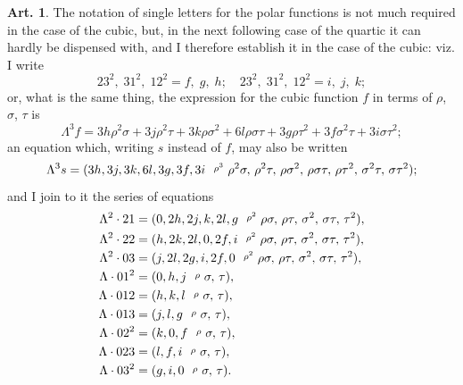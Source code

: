 \documentclass[12pt,a4paper]{article}
\theoremstyle{definition}
\newtheorem{art}{Art.}[section]
\begin{document}
\begin{art}\label{art:50}
The notation of single letters for the polar functions is not much required in the case of the cubic, but, in the next following case of the quartic it can hardly be dispensed with, and I therefore establish it in the case of the cubic: viz. I write
\[
23^2,\; 31^2,\; 12^2 = f,\; g,\; h;\quad 23^2,\; 31^2,\; 12^2 = i,\; j,\; k;
\]
or, what is the same thing, the expression for the cubic function $f$ in terms of $\rho$, $\sigma$, $\tau$ is
\[
\Lambda^3 f = 3h\rho^2\sigma + 3j\rho^2\tau + 3k\rho\sigma^2 + 6l\rho\sigma\tau + 3g\rho\tau^2 + 3f\sigma^2\tau + 3i\sigma\tau^2;
\]
an equation which, writing $s$ instead of $f$, may also be written
\[
\Lambda^3 s = (3h, 3j, 3k, 6l, 3g, 3f, 3i \,\,\,\, \raisebox{0.5ex}{\text{\scriptsize$\rho^3$}}\,\, \rho^2\sigma,\, \rho^2\tau,\, \rho\sigma^2,\, \rho\sigma\tau,\, \rho\tau^2,\, \sigma^2\tau,\, \sigma\tau^2);
\]
and I join to it the series of equations
\begin{align*}
\Lambda^2 \cdot 21 &= (0, 2h, 2j, k, 2l, g \,\,\,\, \raisebox{0.5ex}{\text{\scriptsize$\rho^2$}}\,\, \rho\sigma,\, \rho\tau,\, \sigma^2,\, \sigma\tau,\, \tau^2),\\
\Lambda^2 \cdot 22 &= (h, 2k, 2l, 0, 2f, i \,\,\,\, \raisebox{0.5ex}{\text{\scriptsize$\rho^2$}}\,\, \rho\sigma,\, \rho\tau,\, \sigma^2,\, \sigma\tau,\, \tau^2),\\
\Lambda^2 \cdot 03 &= (j, 2l, 2g, i, 2f, 0 \,\,\,\, \raisebox{0.5ex}{\text{\scriptsize$\rho^2$}}\,\, \rho\sigma,\, \rho\tau,\, \sigma^2,\, \sigma\tau,\, \tau^2),\\
\Lambda \cdot 01^2 &= (0, h, j \,\,\,\, \raisebox{0.5ex}{\text{\scriptsize$\rho$}}\,\, \sigma,\, \tau),\\
\Lambda \cdot 012 &= (h, k, l \,\,\,\, \raisebox{0.5ex}{\text{\scriptsize$\rho$}}\,\, \sigma,\, \tau),\\
\Lambda \cdot 013 &= (j, l, g \,\,\,\, \raisebox{0.5ex}{\text{\scriptsize$\rho$}}\,\, \sigma,\, \tau),\\
\Lambda \cdot 02^2 &= (k, 0, f \,\,\,\, \raisebox{0.5ex}{\text{\scriptsize$\rho$}}\,\, \sigma,\, \tau),\\
\Lambda \cdot 023 &= (l, f, i \,\,\,\, \raisebox{0.5ex}{\text{\scriptsize$\rho$}}\,\, \sigma,\, \tau),\\
\Lambda \cdot 03^2 &= (g, i, 0 \,\,\,\, \raisebox{0.5ex}{\text{\scriptsize$\rho$}}\,\, \sigma,\, \tau).
\end{align*}
\end{art}
\end{document}

